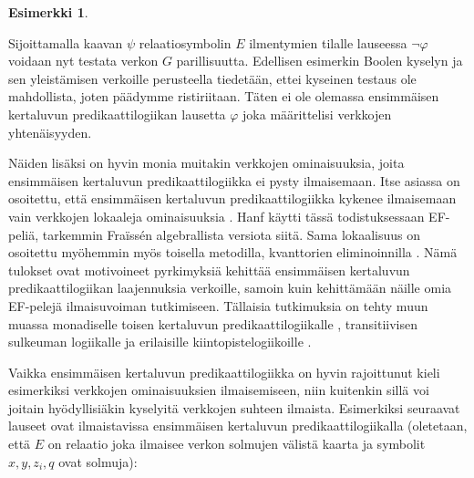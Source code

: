 \documentclass[finnish]{tktltiki2}
\theoremstyle{definition}
\newtheorem{esim}[lau]{Esimerkki}
\theoremstyle{remark}
\begin{document}
\begin{esim}
\begin{center}
\end{center}

Sijoittamalla kaavan $\psi$ relaatiosymbolin $E$ ilmentymien tilalle lauseessa $\neg \varphi$ voidaan nyt testata verkon $G$ parillisuutta. Edellisen esimerkin Boolen kyselyn ja sen yleistämisen verkoille perusteella tiedetään, ettei kyseinen testaus ole mahdollista, joten päädymme ristiriitaan. Täten ei ole olemassa ensimmäisen kertaluvun predikaattilogiikan lausetta $\varphi$ joka määrittelisi verkkojen yhtenäisyyden.
\end{esim}

Näiden lisäksi on hyvin monia muitakin verkkojen ominaisuuksia, joita ensimmäisen kertaluvun predikaattilogiikka ei pysty ilmaisemaan. Itse asiassa on osoitettu, että ensimmäisen kertaluvun predikaattilogiikka kykenee ilmaisemaan vain verkkojen lokaaleja ominaisuuksia \cite{Han65}. Hanf käytti tässä todistuksessaan EF-peliä, tarkemmin Fraïssén algebrallista versiota siitä. Sama lokaalisuus on osoitettu myöhemmin myös toisella metodilla, kvanttorien eliminoinnilla \cite{Gai82}. Nämä tulokset ovat motivoineet pyrkimyksiä kehittää ensimmäisen kertaluvun predikaattilogiikan laajennuksia verkoille, samoin kuin kehittämään näille omia EF-pelejä ilmaisuvoiman tutkimiseen. Tällaisia tutkimuksia on tehty muun muassa monadiselle toisen kertaluvun predikaattilogiikalle \cite{Fag75} \cite{Fag93}, transitiivisen sulkeuman logiikalle \cite{Gra92} ja erilaisille kiintopistelogiikoille \cite{Bos93}.

Vaikka ensimmäisen kertaluvun predikaattilogiikka on hyvin rajoittunut kieli esimerkiksi verkkojen ominaisuuksien ilmaisemiseen, niin kuitenkin sillä voi joitain hyödyllisiäkin kyselyitä verkkojen suhteen ilmaista. Esimerkiksi seuraavat lauseet ovat ilmaistavissa ensimmäisen kertaluvun predikaattilogiikalla (oletetaan, että $E$ on relaatio joka ilmaisee verkon solmujen välistä kaarta ja symbolit $x, y, z_i, q$ ovat solmuja):
\end{document}

